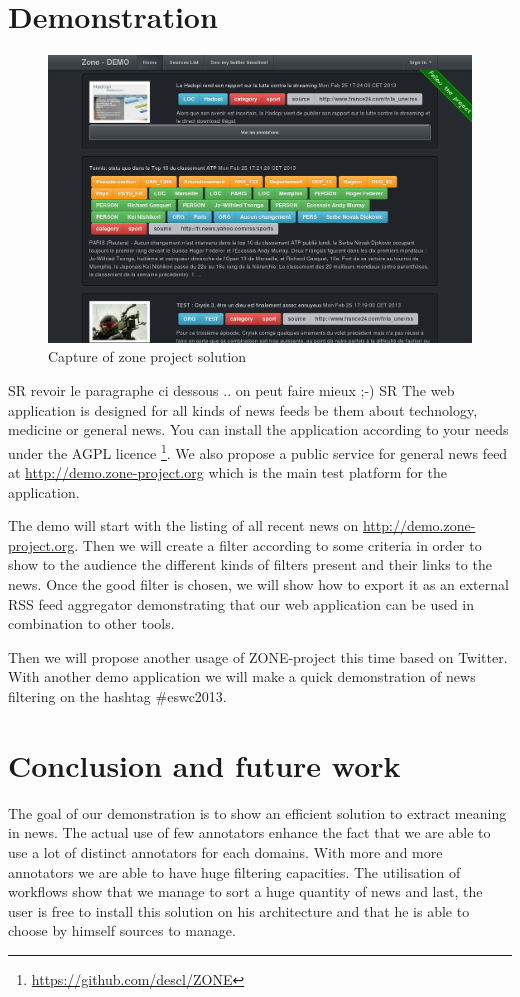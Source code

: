 \documentclass{llncs}
\begin{document}
\section{Demonstration}
%
\begin{figure}[h]
	\includegraphics[width=0.5\columnwidth]{zone-screenshot.png}
	\caption{Capture of zone project solution}
	\label{fig:DEMO}
\end{figure}

SR revoir le paragraphe ci dessous .. on peut faire mieux ;-) SR
The web application is designed for all kinds of news feeds be them about technology, medicine or general news. You can install the application according to your needs under the AGPL licence \footnote{\url{https://github.com/descl/ZONE}}. We also propose a public service for general news feed at \url{http://demo.zone-project.org} which is the main test platform for the application.

The demo will start with the listing of all recent news on \url{http://demo.zone-project.org}. Then we will create a filter according to some criteria in order to show to the audience the different kinds of filters present and their links to the news. Once the good filter is chosen, we will show how to export it as an external RSS feed aggregator demonstrating that our web application can be used in combination to other tools.

Then we will propose another usage of ZONE-project this time based on Twitter. With another demo application we will make a quick demonstration of news filtering on the hashtag \#eswc2013.

\section{Conclusion and future work}
%
The goal of our demonstration is to show an efficient solution to extract meaning in news. The actual use of few annotators enhance the fact that we are able to use a lot of distinct annotators for each domains. With more and more annotators we are able to have huge filtering capacities. The utilisation of workflows show that we manage to sort a huge quantity of news and last, the user is free to install this solution on his architecture and that he is able to choose by himself sources to manage.
\end{document}
